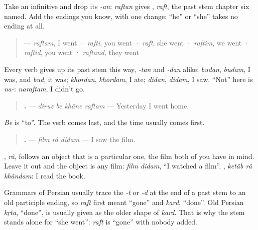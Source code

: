 \begin{grammarlens}[title={Grammar Lens: the past stem, and the same endings}]
Take an infinitive and drop its \emph{-an}: \emph{raftan} gives \textbf{}, \emph{raft}, the past stem chapter six named. Add the endings you know, with one change: \textquotedblleft{}he\textquotedblright{} or \textquotedblleft{}she\textquotedblright{} takes no ending at all.

\begin{quote}
\textbf{} — \emph{raftam}, I went · \emph{rafti}, you went · \emph{raft}, she went · \emph{raftim}, we went · \emph{raftid}, you went · \emph{raftand}, they went
\end{quote}

Every verb gives up its past stem this way, \emph{-tan} and \emph{-dan} alike: \emph{budan}, \emph{budam}, I was, and \emph{bud}, it was; \emph{khordan}, \emph{khordam}, I ate; \emph{didan}, \emph{didam}, I saw. \textquotedblleft{}Not\textquotedblright{} here is \emph{na-}: \emph{naraftam}, I didn't go.

\begin{quote}
\textbf{   .} — \emph{diruz be khâne raftam} — Yesterday I went home.
\end{quote}

\emph{Be} is \textquotedblleft{}to\textquotedblright{}. The verb comes last, and the time usually comes first.
\end{grammarlens}

\begin{grammarlens}[title={Grammar Lens: râ, for the one you mean}]
\begin{quote}
\textbf{  .} — \emph{film râ didam} — I saw the film.
\end{quote}

\textbf{}, \emph{râ}, follows an object that is a particular one, the film both of you have in mind. Leave it out and the object is any film: \emph{film didam}, \textquotedblleft{}I watched a film\textquotedblright{}. \textbf{  }, \emph{ketâb râ khândam}: I read the book.
\end{grammarlens}

\begin{cousinweb}
Grammars of Persian usually trace the \emph{-t} or \emph{-d} at the end of a past stem to an old participle ending, so \emph{raft} first meant \textquotedblleft{}gone\textquotedblright{} and \emph{kard}, \textquotedblleft{}done\textquotedblright{}. Old Persian \emph{kṛta}, \textquotedblleft{}done\textquotedblright{}, is usually given as the older shape of \emph{kard}. That is why the stem stands alone for \textquotedblleft{}she went\textquotedblright{}: \emph{raft} is \textquotedblleft{}gone\textquotedblright{} with nobody added.
\end{cousinweb}

